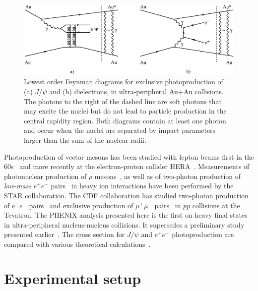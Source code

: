 \documentclass[dvipdfm]{elsart}
\providecommand{\jpsi}{J/\psi}
\begin{document}
\begin{figure}[tb]
\begin{center}
\includegraphics[width=1.0\linewidth]{fig1.eps}
\end{center}
%
\caption{Lowest order Feynman diagrams for exclusive photoproduction of (a) 
$\jpsi$ and (b) dielectrons, in ultra-peripheral Au+Au collisions. The 
photons to the right of the dashed line are soft photons that may excite the 
nuclei but do not lead to particle production in the central rapidity region. 
Both diagrams contain at least one photon and occur when the nuclei are 
separated by impact parameters larger than the sum of the nuclear radii.} 
\label{fig:diag_gg_gA} \end{figure}

Photoproduction of vector mesons has been studied with lepton beams first in 
the 60s~\cite{lanz:65,bau:78} and more recently at the electron-proton 
collider HERA~\cite{Chekanov:2002xi,Aktas:2005xu}. Measurements of 
photonuclear production of $\rho$ mesons~\cite{Adler:2002sc,Abelev:2007nb}, 
as well as of two-photon production of {\it low-mass} $e^+ e^-$ 
pairs~\cite{Adams:2004rz} in heavy ion interactions have been performed by 
the STAR collaboration. The CDF collaboration has studied two-photon 
production of $e^+ e^-$ pairs~\cite{Abulencia:2006nb} and exclusive 
production of $\mu^+ \mu^-$ pairs~\cite{Aaltonen:2009kg} in $p \overline{p}$ 
collisions at the Tevatron.  The PHENIX analysis presented here is the first 
on heavy final states in ultra-peripheral nucleus-nucleus collisions. It 
supersedes a preliminary study presented earlier~\cite{d'Enterria:2006ep}.  
The cross section for $\jpsi$ and $e^+ e^-$ photoproduction are compared with 
various theoretical 
calculations~\cite{Frankfurt:2001db,Strikman:2005ze,Klein:1999qj,Goncalves:2005sn,Ivanov:2007ms}.

\section{Experimental setup}
\label{section:experimental}
\end{document}
